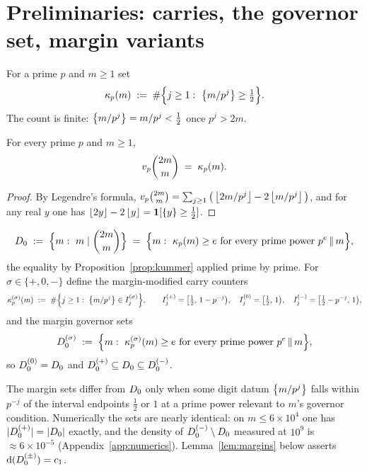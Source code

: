 \section{Preliminaries: carries, the governor set, margin variants}\label{sec:prelim}

\begin{definition}\label{def:kappa}
For a prime $p$ and $m\ge1$ set
\[
\ka_p(m)\;:=\;\#\Big\{j\ge1:\ \fr{m/p^j}\ge\tfrac12\Big\}.
\]
The count is finite: $\left\{m/p^j\right\}=m/p^j<\tfrac12$ once $p^j>2m$.
\end{definition}

\begin{proposition}\label{prop:kummer}
\statusP\quad
For every prime $p$ and $m\ge1$,
\[
v_p\binom{2m}{m}\;=\;\kappa_p(m).
\]
\end{proposition}

\begin{proof}
By Legendre's formula,
$v_p\binom{2m}{m}=\sum_{j\ge1}\big(\left\lfloor 2m/p^j\right\rfloor-2\left\lfloor m/p^j\right\rfloor\big)$, and for
any real $y$ one has $\left\lfloor 2y\right\rfloor-2\left\lfloor y\right\rfloor=\mathbf 1[\left\{y\right\}\ge\tfrac12]$.
\end{proof}

\begin{definition}\label{def:governor}
\[
D_0\;:=\;\Big\{m:\ m\mid\binom{2m}{m}\Big\}
\;=\;\Big\{m:\ \kappa_p(m)\ge e\ \text{for every prime power }p^e\,\|\,m\Big\},
\]
the equality by Proposition~\ref{prop:kummer} applied prime by prime.
For $\sigma\in\{+,0,-\}$ define the margin-modified carry counters
\[
\ka^{(\sigma)}_p(m)\;:=\;\#\Big\{j\ge1:\ \fr{m/p^j}\in I^{(\sigma)}_j\Big\},
\qquad
I^{(+)}_j=\big[\tfrac12,\,1-p^{-j}\big),\quad
I^{(0)}_j=\big[\tfrac12,\,1\big),\quad
I^{(-)}_j=\big[\tfrac12-p^{-j},\,1\big),
\]
and the margin governor sets
\[
D_0^{(\sigma)}\;:=\;\Big\{m:\ \ka^{(\sigma)}_p(m)\ge e
\ \text{for every prime power }p^e\,\|\,m\Big\},
\]
so $D_0^{(0)}=D_0$ and $D_0^{(+)}\subseteq D_0\subseteq D_0^{(-)}$.
\end{definition}

\begin{remark}
The margin sets differ from $D_0$ only when some digit datum
$\left\{m/p^j\right\}$ falls within $p^{-j}$ of the interval endpoints
$\tfrac12$ or $1$ at a prime power relevant to $m$'s governor condition.
Numerically the sets are nearly identical: on $m\le6\times10^4$ one has
$|D_0^{(+)}|=|D_0|$ exactly, and the density of $D_0^{(-)}\setminus D_0$ measured at
$10^9$ is $\approx 6\times10^{-5}$ (Appendix~\ref{app:numerics}).
Lemma~\ref{lem:margins} below asserts $\operatorname{d}(D_0^{(\pm)})=c_1$.
\end{remark}

